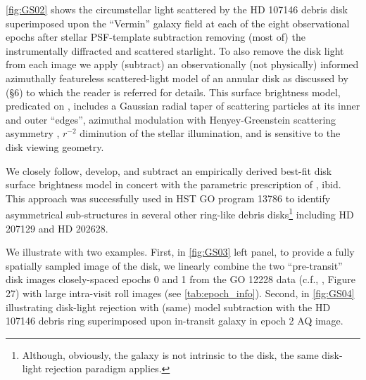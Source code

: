 \documentclass{aa}
\begin{document}
\autoref{fig:GS02} shows the circumstellar light scattered by the HD 107146 debris disk superimposed upon  the “Vermin” galaxy field at each of the eight observational epochs after stellar PSF-template subtraction removing (most of) the instrumentally diffracted and scattered starlight. To also remove the disk light from each image we apply (subtract) an observationally (not physically) informed azimuthally featureless scattered-light model of an annular disk as discussed by \cite{schneider2016extinction} (§6) to which the reader is referred for details. This surface brightness model, predicated on \cite{schneider2006discovery}, includes a Gaussian radial taper of scattering particles at its inner and outer “edges”, azimuthal modulation with Henyey-Greenstein scattering asymmetry \citep{henyey1941diffuse}, $r^{-2}$ diminution of the stellar illumination, and is sensitive to the disk viewing geometry.

We closely follow, develop, and subtract an empirically derived best-fit disk surface brightness model in concert with the parametric prescription of \cite{schneider2016extinction}, ibid. This approach was successfully used in HST GO program 13786 to identify asymmetrical sub-structures in several other ring-like debris disks\footnote{Although, obviously, the galaxy is not intrinsic to the disk, the same disk-light rejection paradigm applies.} including HD 207129 and HD 202628. 

We illustrate with two examples. First, in \autoref{fig:GS03} left panel, to provide a fully spatially sampled image of the disk, we linearly combine the two “pre-transit” disk images closely-spaced epochs 0 and 1 from the GO 12228 data (c.f., \cite{schneider2014probing}, Figure 27) with large intra-visit roll images (see \autoref{tab:epoch_info}). Second, in \autoref{fig:GS04} illustrating disk-light rejection with (same) model subtraction with the HD 107146 debris ring superimposed upon in-transit galaxy in epoch 2 AQ image.

\end{document}
